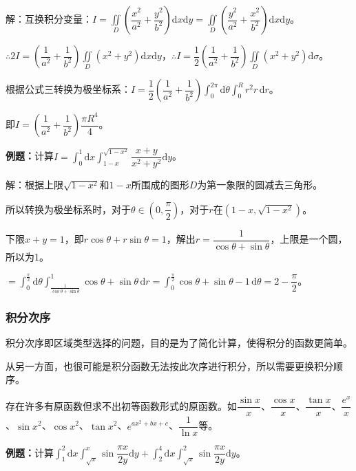 \documentclass[UTF8, 12pt]{ctexart}
\begin{document}
        解：互换积分变量：$I=\displaystyle{\iint\limits_D\left(\dfrac{x^2}{a^2}+\dfrac{y^2}{b^2}\right)\textrm{d}x\textrm{d}y}=\displaystyle{\iint\limits_D\left(\dfrac{y^2}{a^2}+\dfrac{x^2}{b^2}\right)\textrm{d}x\textrm{d}y}$。

        $\therefore2I=\left(\dfrac{1}{a^2}+\dfrac{1}{b^2}\right)\displaystyle{\iint\limits_D(x^2+y^2)\textrm{d}x\textrm{d}y}$，$\therefore I=\dfrac{1}{2}\left(\dfrac{1}{a^2}+\dfrac{1}{b^2}\right)\displaystyle{\iint\limits_D(x^2+y^2)\textrm{d}\sigma}$。

        根据公式三转换为极坐标系：$I=\dfrac{1}{2}\left(\dfrac{1}{a^2}+\dfrac{1}{b^2}\right)\int_0^{2\pi}\textrm{d}\theta\int_0^Rr^2r\,\textrm{d}r$。

        即$I=\left(\dfrac{1}{a^2}+\dfrac{1}{b^2}\right)\dfrac{\pi R^4}{4}$。

        \textbf{例题：}计算$I=\int_0^1\textrm{d}x\int_{1-x}^{\sqrt{1-x^2}}\dfrac{x+y}{x^2+y^2}\textrm{d}y$。

        解：根据上限$\sqrt{1-x^2}$和$1-x$所围成的图形$D$为第一象限的圆减去三角形。

        所以转换为极坐标系时，对于$\theta\in\left(0,\dfrac{\pi}{2}\right)$，对于$r$在$(1-x,\sqrt{1-x^2})$。

        下限$x+y=1$，即$r\cos\theta+r\sin\theta=1$，解出$r=\dfrac{1}{\cos\theta+\sin\theta}$，上限是一个圆，所以为1。

        $=\int_0^\frac{\pi}{2}\textrm{d}\theta\int_\frac{1}{\cos\theta+\sin\theta}^1\cos\theta+\sin\theta\,\textrm{d}r=\int_0^\frac{\pi}{2}\cos\theta+\sin\theta-1\,\textrm{d}\theta=2-\dfrac{\pi}{2}$。

        \subsubsection{积分次序}

        积分次序即区域类型选择的问题，目的是为了简化计算，使得积分的函数更简单。

        从另一方面，也很可能是积分函数无法按此次序进行积分，所以需要更换积分顺序。

        存在许多有原函数但求不出初等函数形式的原函数。如$\dfrac{\sin x}{x}$、$\dfrac{\cos x}{x}$、$\dfrac{\tan x}{x}$、$\dfrac{e^x}{x}$、$\sin x^2$、$\cos x^2$、$\tan x^2$、$e^{ax^2+bx+c}$、$\dfrac{1}{\ln x}$等。

        \textbf{例题：}计算$\displaystyle{\int_1^2\textrm{d}x\int_{\sqrt{x}}^x\sin\dfrac{\pi x}{2y}\textrm{d}y+\int_2^4\textrm{d}x\int_{\sqrt{x}}^2\sin\dfrac{\pi x}{2y}\textrm{d}y}$。
\end{document}
